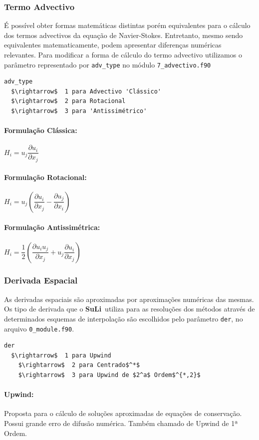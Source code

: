 \documentclass[12pt, a4paper]{article}
\newcommand{\SL}{{\bf SuLi}}
\begin{document}
\subsubsection{Termo Advectivo}

É possível obter formas matemáticas distintas porém equivalentes para o cálculo dos termos advectivos da equação de Navier-Stokes. Entretanto, mesmo sendo equivalentes matematicamente, podem apresentar diferenças numéricas relevantes. Para modificar a forma de cálculo do termo advectivo utilizamos o parâmetro representado por \verb|adv_type| no módulo \verb|7_advectivo.f90|
\begin{lstlisting}[escapeinside='']
adv_type  
  $\rightarrow$  1 para Advectivo 'Clássico'
  $\rightarrow$  2 para Rotacional
  $\rightarrow$  3 para 'Antissimétrico'
\end{lstlisting}

\paragraph{Formulação Clássica:} $H_i = u_j  \dfrac{\partial u_i}{\partial x_j}$
\paragraph{Formulação Rotacional:} $H_i = u_j \left(\dfrac{\partial u_i}{\partial x_j} - \dfrac{\partial u_j}{\partial x_i}\right)$
\paragraph{Formulação Antissimétrica:} $H_i = \dfrac{1}{2} \left(\dfrac{\partial u_i u_j}{\partial x_j} + u_j\dfrac{\partial u_i}{\partial x_j}\right)$

\subsubsection{Derivada Espacial}
As derivadas espaciais são aproximadas por aproximações numéricas das mesmas. Os tipo de derivada que o \SL\ utiliza para as resoluções dos métodos através de determinados esquemas de interpolação são escolhidos pelo parâmetro \verb|der|, no arquivo \verb|0_module.f90|.
\begin{lstlisting}[escapeinside='']
der	
  $\rightarrow$  1 para Upwind
	$\rightarrow$  2 para Centrado$^*$
	$\rightarrow$  3 para Upwind de $2^a$ Ordem$^{*,2}$
\end{lstlisting}

\paragraph{Upwind:} Proposta para o cálculo de soluções aproximadas de equações de conservação. Possui grande erro de difusão numérica. Também chamado de Upwind de 1ª Ordem.
\end{document}

